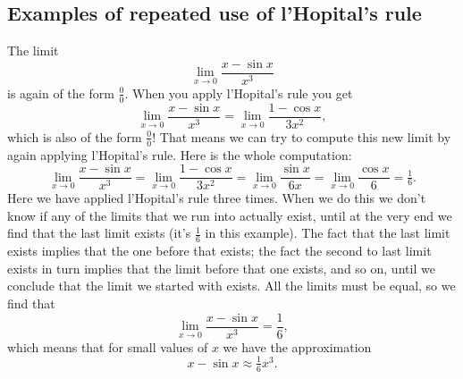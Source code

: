 \subsection{Examples of repeated use of l'Hopital's rule} %
The limit
\[
\lim_{x\to 0} \frac {x - \sin x}{x^3}
\]
is again of the form $\frac00$.  When you apply l'Hopital's rule you
get
\[
\lim_{x\to 0} \frac {x - \sin x}{x^3}
=
\lim_{x\to 0} \frac {1 - \cos x}{3x^2},
\]
which is also of the form $\frac00$!  That means we can try to compute
this new limit by again applying l'Hopital's rule.  Here is the whole
computation:
\[
  \lim_{x\to 0} \frac {x - \sin x}{x^3}
  = \lim_{x\to 0} \frac {1 - \cos x}{3x^2}
  = \lim_{x\to 0} \frac {\sin x}{6x}
  = \lim_{x\to 0} \frac {\cos x}{6}
  = \tfrac16.
\]
Here we have applied l'Hopital's rule three times.  When we do this we
don't know if any of the limits that we run into actually exist, until
at the very end we find that the last limit exists (it's $\frac16$ in
this example).  The fact that the last limit exists implies that the
one before that exists; the fact the second to last limit exists in
turn implies that the limit before that one exists, and so on, until
we conclude that the limit we started with exists.  All the limits
must be equal, so we find that
\[
  \lim_{x\to 0} \frac {x - \sin x}{x^3} = \frac16,
\]
which means that for small values of $x$ we have the approximation
\[
x-\sin x \approx \tfrac16 x^3.
\]








